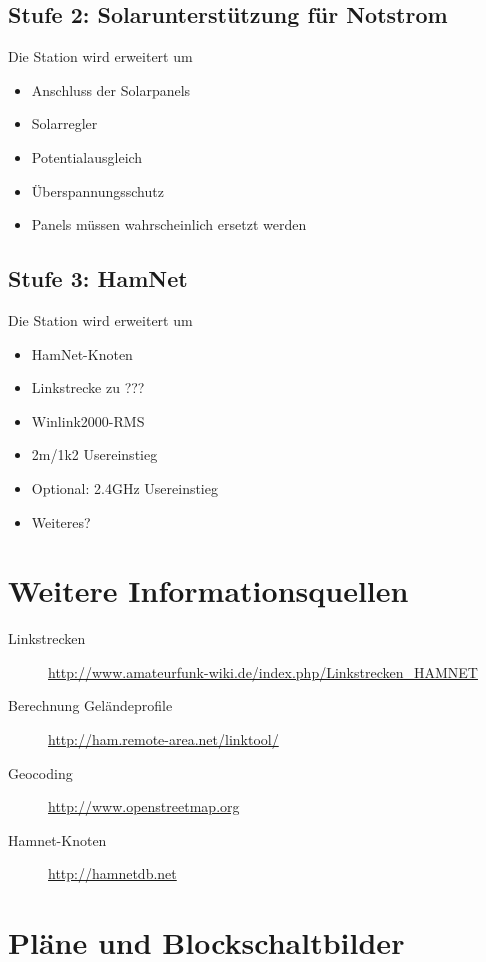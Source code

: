 \documentclass[a4paper]{scrartcl}
\begin{document}
\subsection{Stufe 2: Solarunterst\"utzung f\"ur Notstrom}
Die Station wird erweitert um
\begin{itemize}
    \item Anschluss der Solarpanels
    \item Solarregler
    \item Potentialausgleich
    \item \"Uberspannungsschutz
    \item Panels m\"ussen wahrscheinlich ersetzt werden
\end{itemize}

\subsection{Stufe 3: HamNet}
Die Station wird erweitert um
\begin{itemize}
    \item HamNet-Knoten
    \item Linkstrecke zu ???
    \item Winlink2000-RMS
    \item 2m/1k2 Usereinstieg
    \item Optional: 2.4GHz Usereinstieg
    \item Weiteres?
\end{itemize}

\section{Weitere Informationsquellen}
\begin{description}
    \item[Linkstrecken] \url{http://www.amateurfunk-wiki.de/index.php/Linkstrecken_HAMNET}
    \item[Berechnung Gel\"andeprofile] \url{http://ham.remote-area.net/linktool/}
    \item[Geocoding] \url{http://www.openstreetmap.org}
    \item[Hamnet-Knoten] \url{http://hamnetdb.net}
\end{description}


\appendix


\section{Pl\"ane und Blockschaltbilder}
\end{document}
